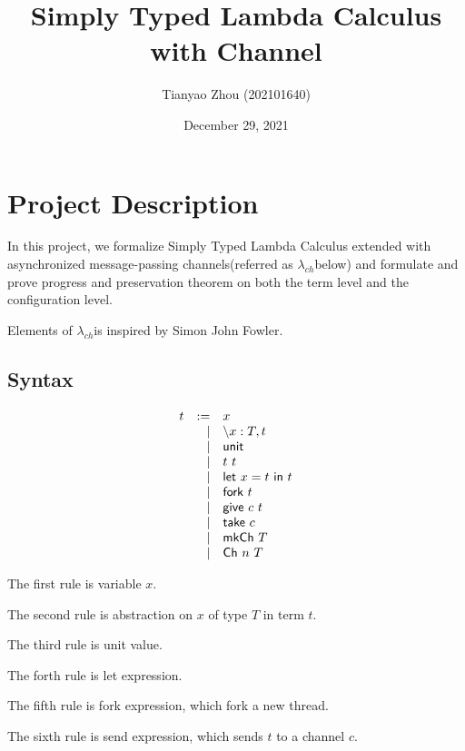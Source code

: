 \documentclass{article}
\title{Simply Typed Lambda Calculus with Channel}
\author{Tianyao Zhou (202101640)}
\date{December 29, 2021}
\newcommand{\lambdach}{$\lambda_{ch}$}
\newcommand{\sco}[1]{\textsf{#1}}
\newcommand{\lam}[3]{\backslash #1 : #2, #3}
\newcommand{\unit}{\sco{unit}}
\newcommand{\letin}[3]{\sco{let } #1 = #2 \sco{ in } #3}
\newcommand{\fork}[1]{\sco{fork }#1}
\newcommand{\give}[2]{\sco{give } #1\ #2}
\newcommand{\take}[1]{\sco{take } #1}
\newcommand{\mkch}[1]{\sco{mkCh } #1}
\newcommand{\channel}[2]{\sco{Ch }#1\ #2}
\begin{document}
\maketitle

\section{Project Description}

In this project, we formalize Simply Typed Lambda Calculus extended with asynchronized message-passing channels(referred as \lambdach below)
and formulate and prove progress and preservation theorem on both the term level and the configuration level.

Elements of \lambdach is inspired by Simon John Fowler\cite{fowler2019typed}.

\subsection{Syntax}

\begin{gather*}
    \begin{array}[]{rrl}
        t & := & x                  \\
          &  | & \lam{x}{T}{t}      \\
          &  | & \unit              \\
          &  | & t\ t               \\
          &  | & \letin{x}{t}{t}    \\
          &  | & \fork{t}           \\
          &  | & \give{c}{t}        \\
          &  | & \take{c}           \\
          &  | & \mkch{T}           \\
          &  | & \channel{n}{T}
    \end{array}
\end{gather*}

The first rule is variable $x$.

The second rule is abstraction on $x$ of type $T$ in term $t$.

The third rule is unit value.

The forth rule is let expression.

The fifth rule is fork expression, which fork a new thread.

The sixth rule is send expression, which sends $t$ to a channel $c$.
\end{document}
